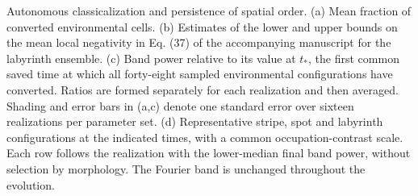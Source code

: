 \caption{Autonomous classicalization and persistence of spatial order.
(a) Mean fraction of converted environmental cells.
(b) Estimates of the lower and upper bounds on the mean local negativity in Eq. (37) of the accompanying manuscript for the labyrinth ensemble.
(c) Band power relative to its value at $t_*$, the first common saved time at which all forty-eight sampled environmental configurations have converted. Ratios are formed separately for each realization and then averaged. Shading and error bars in (a,c) denote one standard error over sixteen realizations per parameter set.
(d) Representative stripe, spot and labyrinth configurations at the indicated times, with a common occupation-contrast scale. Each row follows the realization with the lower-median final band power, without selection by morphology. The Fourier band is unchanged throughout the evolution.}
